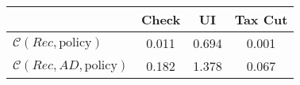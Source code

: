 \begin{tabular}{@{}lccc@{}}
\toprule
                          & Check      & UI    & Tax Cut    \\  \midrule
$\mathcal{C}(Rec,\text{policy})$ & 0.011  & 0.694  & 0.001     \\
$\mathcal{C}(Rec, AD,\text{policy})$ & 0.182  & 1.378  & 0.067     \\
\end{tabular}
